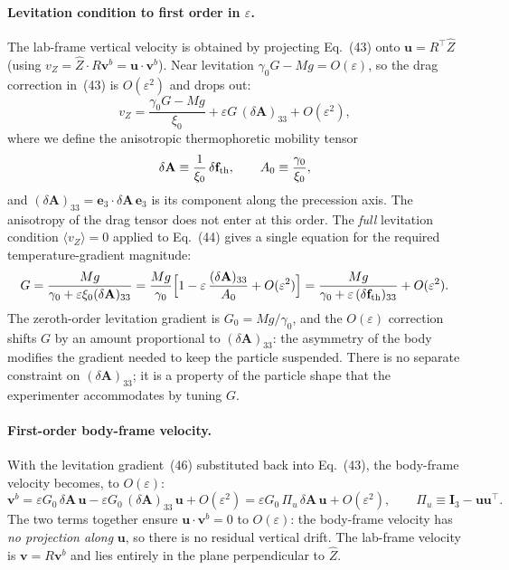 \documentclass[11pt]{article}
\newcommand{\chg}[1]{\marginpar{\raggedright\footnotesize\textcolor{red!70!black}{\textsf{#1}}}}
\newcommand{\vect}[1]{\bm{#1}}
\newcommand{\T}{^{\!\top}}
\begin{document}
\paragraph{Levitation condition to first order in $\varepsilon$.}\chg{C13} The lab-frame vertical velocity is obtained by projecting Eq.~(43) onto $\vect u=R\T\hat Z$ (using $v_Z=\hat Z\cdot R\vect v^b=\vect u\cdot\vect v^b$). Near levitation $\gamma_0G-Mg=O(\varepsilon)$, so the drag correction in~(43) is $O(\varepsilon^2)$ and drops out:
\begin{equation}
  v_Z=\frac{\gamma_0G-Mg}{\xi_0}+\varepsilon G\,(\delta\mathbf A)_{33}+O(\varepsilon^2),
\end{equation}
where we define the anisotropic thermophoretic mobility tensor
\begin{equation}
  \delta\mathbf A\equiv\frac{1}{\xi_0}\,\delta\mathbf f_{\rm th},\qquad A_0\equiv\frac{\gamma_0}{\xi_0},
\end{equation}
and $(\delta\mathbf A)_{33}=\vect e_3\cdot\delta\mathbf A\,\vect e_3$ is its component along the precession axis. The anisotropy of the drag tensor does not enter at this order. The \emph{full} levitation condition $\langle v_Z\rangle=0$ applied to Eq.~(44) gives a single equation for the required temperature-gradient magnitude:
\begin{equation}
  G=\frac{Mg}{\gamma_0+\varepsilon\xi_0(\delta\mathbf A)_{33}}=\frac{Mg}{\gamma_0}\Big[1-\varepsilon\,\frac{(\delta\mathbf A)_{33}}{A_0}+O(\varepsilon^2)\Big]=\frac{Mg}{\gamma_0+\varepsilon\,(\delta\mathbf f_{\rm th})_{33}}+O(\varepsilon^2).
\end{equation}
The zeroth-order levitation gradient is $G_0=Mg/\gamma_0$, and the $O(\varepsilon)$ correction shifts $G$ by an amount proportional to $(\delta\mathbf A)_{33}$: the asymmetry of the body modifies the gradient needed to keep the particle suspended. There is no separate constraint on $(\delta\mathbf A)_{33}$; it is a property of the particle shape that the experimenter accommodates by tuning $G$.

\paragraph{First-order body-frame velocity.} With the levitation gradient~(46) substituted back into Eq.~(43), the body-frame velocity becomes, to $O(\varepsilon)$:
\begin{equation}
  \vect v^b=\varepsilon G_0\,\delta\mathbf A\,\vect u-\varepsilon G_0\,(\delta\mathbf A)_{33}\,\vect u+O(\varepsilon^2)=\varepsilon G_0\,\Pi_u\,\delta\mathbf A\,\vect u+O(\varepsilon^2),\qquad \Pi_u\equiv\mathbf I_3-\vect u\vect u\T .
\end{equation}
The two terms together ensure $\vect u\cdot\vect v^b=0$ to $O(\varepsilon)$: the body-frame velocity has \emph{no projection along} $\vect u$, so there is no residual vertical drift. The lab-frame velocity is $\vect v=R\vect v^b$ and lies entirely in the plane perpendicular to $\hat Z$.
\end{document}
